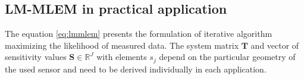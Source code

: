 \subsection{LM-MLEM in practical application}
The equation \ref{eq:lmmlem} presents the formulation of iterative algorithm maximizing the likelihood of measured data.
The system matrix $\mathbf{T}$ and vector of sensitivity values $\mathbf{S} \in \mathbb{R}^{J}$ with elements $s_{j}$ depend on the particular geometry of the used sensor and need to be derived individually in each application.








